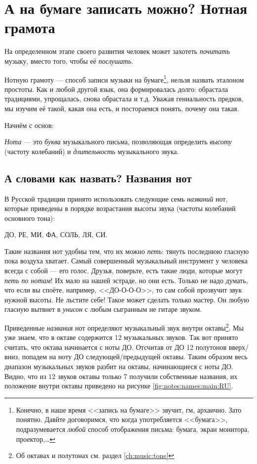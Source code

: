\chapter{А на бумаге записать можно? Нотная грамота}
\label{ch:notes}

На определенном этапе своего развития человек может захотеть \emph{почитать} музыку, вместо того, чтобы её \emph{послушать}.

Нотную грамоту --- способ записи музыки на бумаге\footnote{Конечно, в наше время <<запись на бумаге>> звучит, гм, архаично. Зато понятно. Давйте договоримся, что когда употребляется <<бумага>>, подразумевается \emph{любой} способ отображения письма: бумага, экран монитора, проектор,\ldots}, нельзя назвать эталоном простоты. Как и любой другой язык, она формировалась долго: обрастала традициями, упрощалась, снова обрастала и т.д. Уважая гениальность предков, мы изучим её такой, какая она есть, и постораемся понять, почему она такая.

Начнём с основ:

\begin{Definition}[Нота]
    \emph{Нота} --- это \emph{буква} музыкального письма, позволяющая определить \emph{высоту} (частоту колебаний) и \emph{длительность} музыкального звука. 
\end{Definition}


\section{А словами как назвать? Названия нот}
\label{ch:notes:names}

В Русской традиции принято использовать следующие семь \emph{названий} нот, которые приведены в порядке возрастания высоты звука (частоты колебаний основного тона): 
\begin{center}
    ДО, РЕ, МИ, ФА, СОЛЬ, ЛЯ, СИ.
\end{center}

Такие названия нот удобны тем, что их можно \emph{петь}: тянуть последнюю гласную пока воздуха хватает. Самый совершенный музыкальный инструмент у человека всегда с собой --- его голос. Друзья, поверьте, есть такие люди, которые могут \emph{петь по нотам}! Их мало на нашей эстраде, но они есть. Только не надо думать, что если вы споёте, например, <<ДО-О-О-О>>, то сам собой прозвучит звук нужной высоты. Не льстите себе! Такое может сделать только мастер. Он любую гласную вытянет в \emph{унисон} с любым сыгранным не гитаре звуком.

Приведенные \emph{названия} нот определяют музыкальный звук внутри октавы\footnote{Об октавах и полутонах см. раздел \ref{ch:music:tone}}. Мы уже знаем, что в октаве содержится 12 музыкальных звуков. Так вот принято считать, что октава начинается с ноты ДО. Отсчитав от ДО 12 полутонов вверх/вниз, попадем на ноту ДО следующей/предыдущей октавы. Таким образом весь диапазон музыкальных звуков разбит на октавы, начинающиеся с ноты ДО. Видно, что из 12 звуков октавы только 7 получили собственные названия, их положение внутри октавы приведено на рисунке \ref{fig:notes:names:main:RU}.


